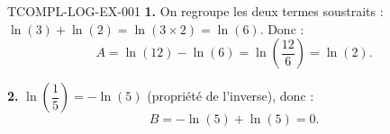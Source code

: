 \begin{corrige}{TCOMPL-LOG-EX-001}
\textbf{1.} On regroupe les deux termes soustraits : $\ln(3)+\ln(2) = \ln(3\times2) = \ln(6)$. Donc :
\[
  A = \ln(12) - \ln(6) = \ln\!\left(\frac{12}{6}\right) = \ln(2).
\]

\textbf{2.} $\ln\!\left(\dfrac{1}{5}\right) = -\ln(5)$ (propriété de l'inverse), donc :
\[
  B = -\ln(5) + \ln(5) = 0.
\]
\end{corrige}
